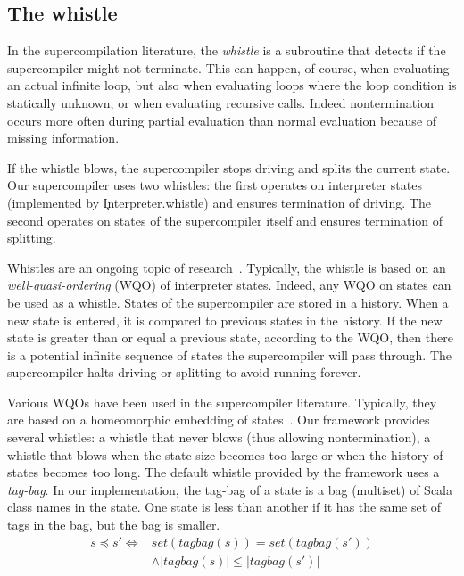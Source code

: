 \subsection{The whistle}

In the supercompilation literature, the \emph{whistle}
is a subroutine that detects if the supercompiler
might not terminate.
This can happen, of course, when evaluating an actual infinite loop, but also 
when evaluating loops where the loop condition is statically unknown, or
when evaluating recursive calls. Indeed nontermination occurs more often
during partial evaluation than normal evaluation because of missing
information.

If the whistle blows, the supercompiler
stops driving and splits the current state.
Our supercompiler uses two whistles: the first operates
on interpreter states (implemented by \c{Interpreter.whistle})
and ensures termination of driving. The second operates on states of the supercompiler
itself and ensures termination of splitting.

Whistles are an ongoing topic of research~\cite{whistles64}.
Typically, the whistle is based on an \emph{well-quasi-ordering} (WQO) of
interpreter states.
Indeed, any WQO on states can be used as a whistle.
States of the supercompiler are stored in a history.
When a new state is entered, it is compared to previous states
in the history. If the new state is greater than or equal a previous state,
according to the WQO, then
there is a potential infinite sequence of states
the supercompiler will pass through. The supercompiler halts driving or
splitting to avoid running forever.

Various WQOs have been used in the supercompiler literature.
Typically, they are based on a homeomorphic embedding of
states~\cite{whistles64}.
Our framework provides several whistles: a whistle that
never blows (thus allowing nontermination), a whistle that 
blows when the state size becomes too large or when the history of states becomes too
long.
The default whistle provided by the framework uses a \emph{tag-bag}.
In our implementation, 
the tag-bag of a state is a bag (multiset) of 
Scala class names in the state.
One state is less than another if it has the same set of tags
in the bag, but the bag is smaller.
\begin{align*}
  s \preceq s'
   \iff&
  \mathit{set}(\mathit{tagbag}(s))
  =
  \mathit{set}(\mathit{tagbag}(s')) \\
  &
  \wedge
  |\mathit{tagbag}(s)|
  \le
  |\mathit{tagbag}(s')|
\end{align*}

